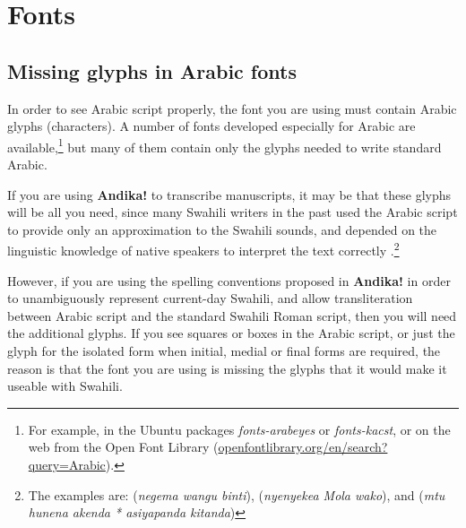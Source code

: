 \chapter{Fonts}
\label{ch:fonts}

\section{Missing glyphs in Arabic fonts}

In order to see Arabic script properly, the font you are using must contain Arabic glyphs (characters).  A number of fonts developed especially for Arabic are available,\footnote{For example, in the Ubuntu packages \textit{fonts-arabeyes} or \textit{fonts-kacst}, or on the web from the Open Font Library (\url{openfontlibrary.org/en/search?query=Arabic}).} but many of them contain only the glyphs needed to write standard Arabic.

If you are using \textbf{Andika!} to transcribe manuscripts, it may be that these glyphs will be all you need, since many Swahili writers in the past used the Arabic script to provide only an approximation to the Swahili sounds, and depended on the linguistic knowledge of native speakers to interpret the text correctly \citep[p14-15]{Omar2002}.\footnote{The examples are:  (\textit{negema wangu binti}),  (\textit{nyenyekea Mola wako}), and  (\textit{mtu hunena akenda * asiyapanda kitanda})}

However, if you are using the spelling conventions proposed in \textbf{Andika!} in order to unambiguously represent current-day Swahili, and allow transliteration between Arabic script and the standard Swahili Roman script, then you will need the additional glyphs.  If you see squares or boxes in the Arabic script, or just the glyph for the isolated form when initial, medial or final forms are required, the reason is that the font you are using is missing the glyphs that it would make it useable with Swahili.


